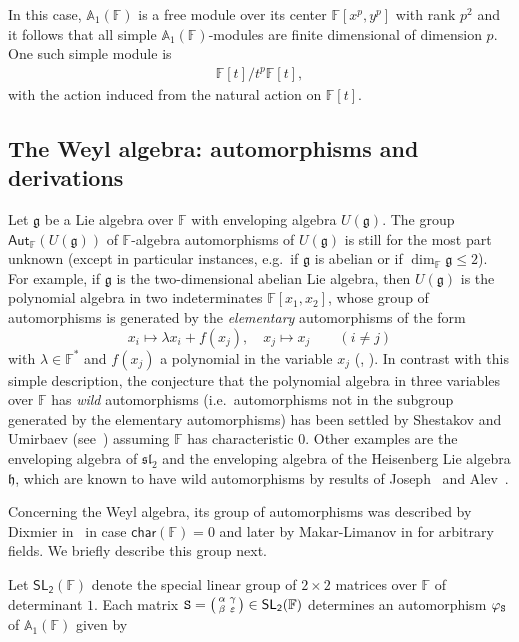 \documentclass{commat}
\newcommand\q{\quad}
\newcommand{\FF}{\mathbb{F}}
\newcommand{\wa}[1][1]{\mathbb{A}_{#1}}
\newcommand\chara{\mathsf {char}}
\newcommand\aut[1][\FF]{ \mathsf{Aut}_{#1}}
\newcommand{\g}{\mathfrak g}
\newcommand{\h}{\mathfrak h}
\begin{document}
In this case, $\wa(\FF)$ is a free module over its center $\FF[x^p, y^p]$ with rank $p^2$ and it follows that all simple $\wa(\FF)$-modules are finite dimensional of dimension $p$. One such simple module is
\begin{align*}
	\FF[t]/t^p\FF[t],
\end{align*}
with the action induced from the natural action on $\FF[t]$.

\subsection{The Weyl algebra: automorphisms and derivations}\label{SS:intro:wa:ad}

Let $\g$ be a Lie algebra over $\FF$ with enveloping algebra $U(\g)$. The group $\aut (U(\g))$ of $\FF$-algebra automorphisms of $U(\g)$ is still for the most part unknown (except in particular instances, e.g.\ if $\g$ is abelian or if $\dim_\FF\g\leq 2$). For example, if 
$\g$ is the two-dimensional abelian Lie algebra, then $U(\g)$ is the polynomial algebra in two indeterminates $\FF[x_{1}, x_{2}]$, whose group of automorphisms is generated by the \emph{elementary} automorphisms of the form
\begin{equation*}
	x_{i}\mapsto \lambda x_{i}+f(x_{j}), \q x_{j}\mapsto x_{j} \q\q (i\neq j)
\end{equation*}
with $\lambda\in\FF^*$ and $f(x_{j})$ a polynomial in the variable $x_{j}$ (\cite{hJ42}, \cite{vdK53}). In contrast with this simple description, the conjecture that the polynomial algebra in three variables over 
$\FF$ has \emph{wild} automorphisms (i.e.\ automorphisms not in the subgroup generated by the elementary automorphisms) has been settled by Shestakov and Umirbaev (see~\cite{SU04}) assuming $\FF$ has characteristic $0$. Other examples are the enveloping algebra of $\mathfrak{sl}_{2}$ and the enveloping algebra of the Heisenberg Lie algebra $\h$, which are known to have wild automorphisms by results of Joseph~\cite{aJ76} and Alev~\cite{jA86}.

Concerning the Weyl algebra, its group of automorphisms was described by Dixmier in~\cite{jD68} in case $\chara(\FF)=0$ and later by Makar-Limanov in \cite{ML84} for arbitrary fields. We briefly describe this group next.


Let $\mathsf{SL_2(\FF)}$ denote the special linear group of $2 \times 2$ matrices over $\FF$ of
determinant $1$.   Each matrix  $\tt{S} =  \left( \begin{smallmatrix} \alpha & \gamma \\  \beta & \varepsilon \end{smallmatrix} \right)  \in \mathsf{SL_2(\FF)}$ determines an automorphism $\varphi_{\tt S}$  of $\wa(\FF)$ given by 
\end{document}
